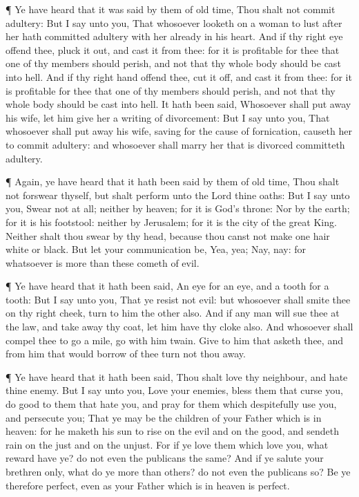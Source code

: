  ¶ Ye have heard that it was said by them of old time, Thou
shalt not commit adultery:  But I say unto you, That
whosoever looketh on a woman to lust after her hath committed adultery
with her already in his heart.  And if thy right eye offend
thee, pluck it out, and cast it from thee: for it is profitable for thee
that one of thy members should perish, and not that thy whole body
should be cast into hell.  And if thy right hand offend
thee, cut it off, and cast it from thee: for it is profitable for thee
that one of thy members should perish, and not that thy whole body
should be cast into hell.  It hath been said, Whosoever
shall put away his wife, let him give her a writing of divorcement:
 But I say unto you, That whosoever shall put away his
wife, saving for the cause of fornication, causeth her to commit
adultery: and whosoever shall marry her that is divorced committeth
adultery.

 ¶ Again, ye have heard that it hath been said by them of
old time, Thou shalt not forswear thyself, but shalt perform unto the
Lord thine oaths:  But I say unto you, Swear not at all;
neither by heaven; for it is God's throne:  Nor by the
earth; for it is his footstool: neither by Jerusalem; for it is the city
of the great King.  Neither shalt thou swear by thy head,
because thou canst not make one hair white or black.  But
let your communication be, Yea, yea; Nay, nay: for whatsoever is more
than these cometh of evil.

 ¶ Ye have heard that it hath been said, An eye for an eye,
and a tooth for a tooth:  But I say unto you, That ye
resist not evil: but whosoever shall smite thee on thy right cheek, turn
to him the other also.  And if any man will sue thee at the
law, and take away thy coat, let him have thy cloke also. 
And whosoever shall compel thee to go a mile, go with him twain.
 Give to him that asketh thee, and from him that would
borrow of thee turn not thou away.

 ¶ Ye have heard that it hath been said, Thou shalt love
thy neighbour, and hate thine enemy.  But I say unto you,
Love your enemies, bless them that curse you, do good to them that hate
you, and pray for them which despitefully use you, and persecute you;
 That ye may be the children of your Father which is in
heaven: for he maketh his sun to rise on the evil and on the good, and
sendeth rain on the just and on the unjust.  For if ye love
them which love you, what reward have ye? do not even the publicans the
same?  And if ye salute your brethren only, what do ye more
than others? do not even the publicans so?  Be ye therefore
perfect, even as your Father which is in heaven is perfect.

